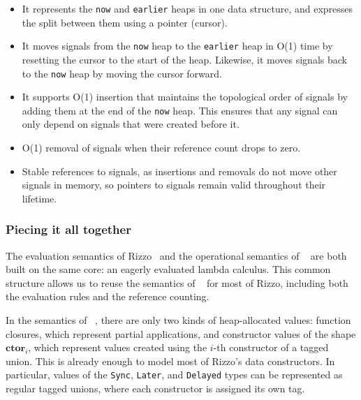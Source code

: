 \begin{itemize}
    \item It represents the \texttt{now} and \texttt{earlier} heaps in one data structure, and expresses the split between them using a pointer (cursor).
    \item It moves signals from the \texttt{now} heap to the \texttt{earlier} heap in O(1) time by resetting the cursor to the start of the heap. Likewise, it moves signals back to the \texttt{now} heap by moving the cursor forward.
    \item It supports O(1) insertion that maintains the topological order of signals by adding them at the end of the \texttt{now} heap. This ensures that any signal can only depend on signals that were created before it.
    \item O(1) removal of signals when their reference count drops to zero.
    \item Stable references to signals, as insertions and removals do not move other signals in memory, so pointers to signals remain valid throughout their lifetime.
\end{itemize}

\subsubsection{Piecing it all together}

The evaluation semantics of Rizzo~\cite{rizzo_modal_2025} and the operational semantics of \citeauthor*{ullrich_counting_2021}~\cite{ullrich_counting_2021} are both built on the same core: an eagerly evaluated lambda calculus. This common structure allows us to reuse the semantics of \citeauthor*{ullrich_counting_2021}~\cite{ullrich_counting_2021} for most of Rizzo, including both the evaluation rules and the reference counting.

In the semantics of \citeauthor*{ullrich_counting_2021}~\cite{ullrich_counting_2021}, there are only two kinds of heap-allocated values: function closures, which represent partial applications, and constructor values of the shape $\mathbf{ctor}_i$, which represent values created using the $i\text{-th}$ constructor of a tagged union.
This is already enough to model most of Rizzo's data constructors. 
In particular, values of the \texttt{Sync}, \texttt{Later}, and \texttt{Delayed} types can be represented as regular tagged unions, where each constructor is assigned its own tag.

